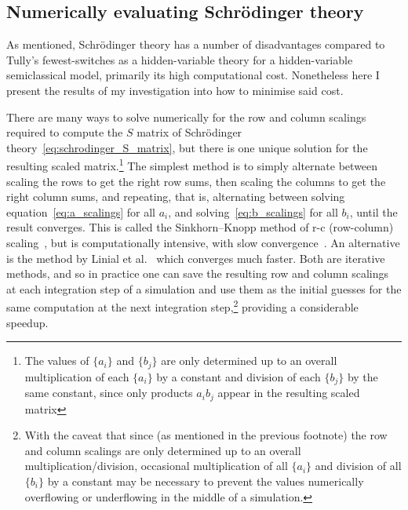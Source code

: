 \subsection{Numerically evaluating Schr\"odinger theory}\label{sec:schrodinger_theory_numerics}

As mentioned, Schr\"odinger theory has a number of disadvantages compared to Tully's fewest-switches as a hidden-variable theory for a hidden-variable semiclassical model, primarily its high computational cost. Nonetheless here I present the results of my investigation into how to minimise said cost.

There are many ways to solve numerically for the row and column scalings required to compute the $S$ matrix of Schr\"odinger theory~\eqref{eq:schrodinger_S_matrix}, but there is one unique solution for the resulting scaled matrix.\footnote{The values of $\{a_i\}$ and $\{b_j\}$ are only determined up to an overall multiplication of each $\{a_i\}$ by a constant and division of each $\{b_j\}$ by the same constant, since only products $a_i b_j$ appear in the resulting scaled matrix} The simplest method is to simply alternate between scaling the rows to get the right row sums, then scaling the columns to get the right column sums, and repeating, that is, alternating between solving equation~\eqref{eq:a_scalings} for all $a_i$, and solving~\eqref{eq:b_scalings} for all $b_i$, until the result converges. This is called the Sinkhorn--Knopp method of r-c (row-column) scaling~\cite{knight_sinkhornknopp_2008}, but is computationally intensive, with slow convergence~\cite{Linial2000}. An alternative is the method by Linial et al.~\cite{Linial2000} which converges much faster. Both are iterative methods, and so in practice one can save the resulting row and column scalings at each integration step of a simulation and use them as the initial guesses for the same computation at the next integration step,\footnote{With the caveat that since (as mentioned in the previous footnote) the row and column scalings are only determined up to an overall multiplication/division, occasional multiplication of all $\{a_i\}$ and division of all $\{b_i\}$ by a constant may be necessary to prevent the values numerically overflowing or underflowing in the middle of a simulation.} providing a considerable speedup.

